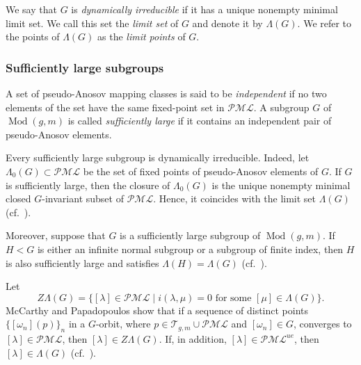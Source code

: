 \documentclass[dvipdfmx]{amsart}
\theoremstyle{remark}
\newcommand{\teich}{\mathcal{T}}
\newcommand{\tmod}{\operatorname{Mod}}
\newcommand{\pml}{\mathcal{PML}}
\begin{document}
We say that $G$ is \emph{dynamically irreducible} if it has a unique nonempty minimal limit set. We call this set the \emph{limit set} of $G$ and denote it by $\Lambda(G)$. We refer to the points of $\Lambda(G)$ as the \emph{limit points} of $G$.

\subsubsection{Sufficiently large subgroups}

A set of pseudo-Anosov mapping classes is said to be \emph{independent} if no two elements of the set have the same fixed-point set in $\pml$. A subgroup $G$ of $\tmod(g,m)$ is called \emph{sufficiently large} if it contains an independent pair of pseudo-Anosov elements.

Every sufficiently large subgroup is dynamically irreducible. Indeed, let $\Lambda_0(G)\subset\pml$ be the set of fixed points of pseudo-Anosov elements of $G$. If $G$ is sufficiently large, then the closure of $\Lambda_0(G)$ is the unique nonempty minimal closed $G$-invariant subset of $\pml$. Hence, it coincides with the limit set $\Lambda(G)$ (cf.\ \cite[Corollary 4.2]{McCarthyPapadopoulos1989}).

Moreover, suppose that $G$ is a sufficiently large subgroup of $\tmod(g,m)$. If $H<G$ is either an infinite normal subgroup or a subgroup of finite index, then $H$ is also sufficiently large and satisfies $\Lambda(H)=\Lambda(G)$ (cf.\ \cite[Propositions 5.1, 5.4, and 5.5]{McCarthyPapadopoulos1989}).

Let
\[
Z\Lambda(G)=\{[\lambda]\in\pml\mid
i(\lambda,\mu)=0\text{ for some }[\mu]\in\Lambda(G)\}.
\]
McCarthy and Papadopoulos show that if a sequence of distinct points $\{[\omega_n](p)\}_n$ in a $G$-orbit, where $p\in\teich_{g,m}\cup\pml$ and $[\omega_n]\in G$, converges to $[\lambda]\in\pml$, then $[\lambda]\in Z\Lambda(G)$. If, in addition, $[\lambda]\in\pml^{ue}$, then $[\lambda]\in\Lambda(G)$ (cf.\ \cite[Proposition 8.1]{McCarthyPapadopoulos1989}).
\end{document}
